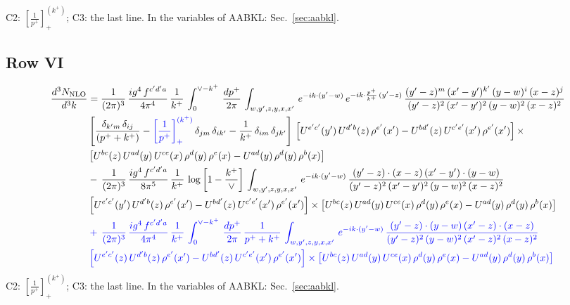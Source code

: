 \documentclass[9pt]{article}
\newcommand{\new}[1]{{\color{blue}#1}}
\newcommand{\nc}{\color{blue}}
\numberwithin{equation}{section}
\begin{document}
\new{C2: $\left[\frac{1}{p^+}\right]_+^{(k^+)}$; C3: the last line. In the variables of AABKL: Sec.~\ref{sec:aabkl}.}
\subsection{Row VI}
\begin{align}
    \frac{d^{3}N_{\rm NLO}}{d^{3}k} & = \frac{1}{(2\pi)^{3}}\, \frac{ig^{4}\,f^{c'd'a}}{4\pi^{4}}\, \frac{1}{k^{+}}\,\int_{0}^{\vee-k^{+}}\, \frac{dp^{+}}{2\pi}\, \int_{w,y',z,y,x,x'}\, e^{-ik\cdot (y'-w)}\, e^{-ik\cdot \frac{p^{+}}{k^{+}}\,(y'-z)}\,\frac{(y'-z)^{m}\,(x'-y')^{k'}\,(y-w)^{i}\,(x-z)^{j}}{(y'-z)^{2}\,(x'-y')^{2}\,(y-w)^{2}\,(x-z)^{2}}\notag \\ & \left[\frac{\delta_{k'm}\,\delta_{ij}}{(p^{+}+k^{+})}-\new{\left[\frac{1}{p^{+}}\right]_{+}^{(k^{+})}}\,\delta_{jm}\,\delta_{ik'}-\frac{1}{k^{+}}\, \delta_{im}\, \delta_{jk'}\right]\, \left[U^{e'c'}(y')\,U^{d'b}(z)\,\rho^{e'}(x')-U^{bd'}(z)\,U^{c'e'}(x')\,\rho^{e'}(x')\right]\times\notag \\ &  \left[U^{bc}(z)\,U^{ad}(y)\,U^{ce}(x)\,\rho^{d}(y)\,\rho^{e}(x)-U^{ad}(y)\,\rho^{d}(y)\,\rho^{b}(x)\right]\notag \\ &  -\,\frac{1}{(2\pi)^{3}}\, \frac{ig^{4}\,f^{c'd'a}}{8\pi^{5}}\, \frac{1}{k^{+}}\, \log{\left[1-\frac{k^{+}}{\vee}\right]}\, \int_{w,y',z,y,x,x'}\, e^{-ik\cdot (y'-w)}\,\frac{(y'-z)\cdot (x-z)\,(x'-y')\cdot (y-w)}{(y'-z)^{2}\,(x'-y')^{2}\,(y-w)^{2}\,(x-z)^{2}}\notag \\ & \left[U^{e'c'}(y')\,U^{d'b}(z)\,\rho^{e'}(x')-U^{bd'}(z)\,U^{c'e'}(x')\,\rho^{e'}(x')\right]\times  \left[U^{bc}(z)\,U^{ad}(y)\,U^{ce}(x)\,\rho^{d}(y)\,\rho^{e}(x)-U^{ad}(y)\,\rho^{d}(y)\,\rho^{b}(x)\right]
\notag \\ & \nc +\,\frac{1}{(2\pi)^{3}}\, \frac{ig^{4}\,f^{c'd'a}}{4\pi^{4}}\, \frac{1}{k^{+}}\,\int_{0}^{\vee-k^{+}}\, \frac{dp^{+}}{2\pi}\,\frac{1}{p^{+}+k^{+}}\, \int_{w,y',z,y,x,x'}\, e^{-ik\cdot (y'-w)}\,\frac{(y'-z)\cdot (y-w)\,(x'-z)\cdot (x-z)}{(y'-z)^{2}\,(y-w)^{2}\,(x'-z)^{2}\,(x-z)^{2}}\notag \\ & \nc \left[U^{e'c'}(z)\,U^{d'b}(z)\,\rho^{e'}(x')-U^{bd'}(z)\,U^{c'e'}(x')\,\rho^{e'}(x')\right]\times\left[U^{bc}(z)\,U^{ad}(y)\,U^{ce}(x)\,\rho^{d}(y)\,\rho^{e}(x)-U^{ad}(y)\,\rho^{d}(y)\,\rho^{b}(x)\right]
\end{align}
\new{C2: $\left[\frac{1}{p^+}\right]_+^{(k^+)}$; C3: the last line. In the variables of AABKL: Sec.~\ref{sec:aabkl}.}


\end{document}
